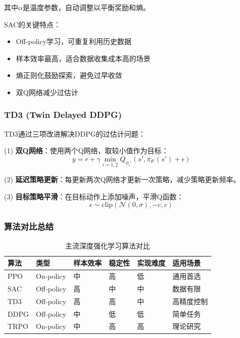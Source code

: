 \documentclass[12pt,a4paper]{ctexart}
\begin{document}
其中$\alpha$是温度参数，自动调整以平衡奖励和熵。

SAC的关键特点：
\begin{itemize}
    \item Off-policy学习，可重复利用历史数据
    \item 样本效率最高，适合数据收集成本高的场景
    \item 熵正则化鼓励探索，避免过早收敛
    \item 双Q网络减少过估计
\end{itemize}

\subsubsection{TD3 (Twin Delayed DDPG)}

TD3通过三项改进解决DDPG的过估计问题：

(1) \textbf{双Q网络}：使用两个Q网络，取较小值作为目标：
\begin{equation}
    y = r + \gamma \min_{i=1,2} Q_{\phi_i'}(s', \pi_{\theta'}(s') + \epsilon)
\end{equation}

(2) \textbf{延迟策略更新}：每更新两次Q网络才更新一次策略，减少策略更新频率。

(3) \textbf{目标策略平滑}：在目标动作上添加噪声，平滑Q函数：
\begin{equation}
    \epsilon \sim \text{clip}(\mathcal{N}(0, \sigma), -c, c)
\end{equation}

\subsubsection{算法对比总结}

\begin{table}[htbp]
\centering
\caption{主流深度强化学习算法对比}\label{tab:rl_algorithms}
\begin{tabular}{@{}llllll@{}}
\toprule
\textbf{算法} & \textbf{类型} & \textbf{样本效率} & \textbf{稳定性} & \textbf{实现难度} & \textbf{适用场景} \\
\midrule
PPO & On-policy & 中 & 高 & 低 & 通用首选 \\
SAC & Off-policy & 高 & 中 & 中 & 数据有限 \\
TD3 & Off-policy & 高 & 高 & 中 & 高精度控制 \\
DDPG & Off-policy & 中 & 低 & 低 & 简单任务 \\
TRPO & On-policy & 中 & 高 & 高 & 理论研究 \\
\bottomrule
\end{tabular}
\end{table}
\end{document}
